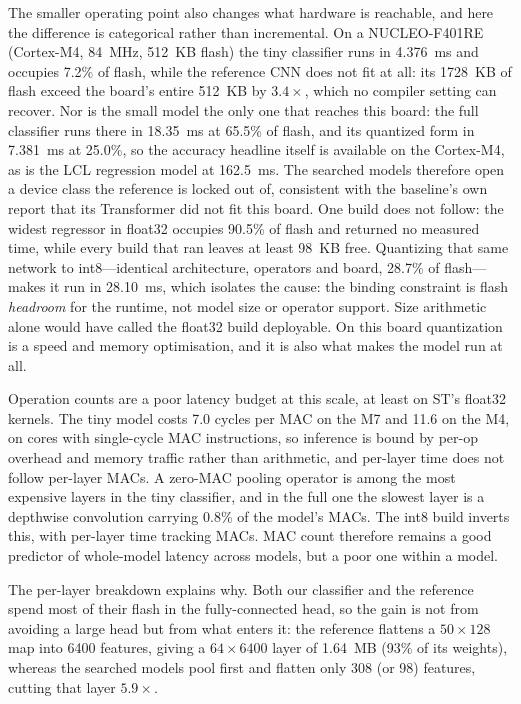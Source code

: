 \documentclass[journal]{IEEEtran}
\begin{document}
The smaller operating point also changes what hardware is reachable, and here the
difference is categorical rather than incremental. On a NUCLEO-F401RE
(Cortex-M4, 84~MHz, 512~KB flash) the tiny classifier runs in 4.376~ms and
occupies 7.2\% of flash, while the reference CNN does not fit at all: its
1728~KB of flash exceed the board's entire 512~KB by $3.4\times$, which no
compiler setting can recover. Nor is the small model the only one that reaches
this board: the full classifier runs there in 18.35~ms at 65.5\% of flash, and
its quantized form in 7.381~ms at 25.0\%, so the accuracy headline itself is
available on the Cortex-M4, as is the LCL regression model at 162.5~ms. The
searched models therefore open a device class the reference is locked out of,
consistent with the baseline's own report that its Transformer did not fit this
board. One build does not follow: the widest regressor in float32 occupies
90.5\% of flash and returned no measured time, while every build that ran leaves
at least 98~KB free. Quantizing that same network to int8---identical
architecture, operators and board, 28.7\% of flash---makes it run in 28.10~ms,
which isolates the cause: the binding constraint is flash \emph{headroom} for
the runtime, not model size or operator support. Size arithmetic alone would
have called the float32 build deployable. On this board quantization is a speed
and memory optimisation, and it is also what makes the model run at all.

Operation counts are a poor latency budget at this scale, at least on ST's
float32 kernels. The tiny model costs 7.0 cycles per MAC on the M7 and 11.6 on
the M4, on cores with single-cycle MAC instructions, so inference is bound by
per-op overhead and memory traffic rather than arithmetic, and per-layer time
does not follow per-layer MACs. A zero-MAC pooling operator is among the most
expensive layers in the tiny classifier, and in the full one the slowest layer
is a depthwise convolution carrying 0.8\% of the model's MACs. The int8 build
inverts this, with per-layer time tracking MACs. MAC count therefore remains a
good predictor of whole-model latency across models, but a poor one within a
model.

The per-layer breakdown explains why. Both our classifier and the reference spend
most of their flash in the fully-connected head, so the gain is not from
avoiding a large head but from what enters it: the reference flattens a
$50\times128$ map into 6400 features, giving a $64\times6400$ layer of 1.64~MB
(93\% of its weights), whereas the searched models pool first and flatten only
308 (or 98) features, cutting that layer $5.9\times$.
\end{document}
